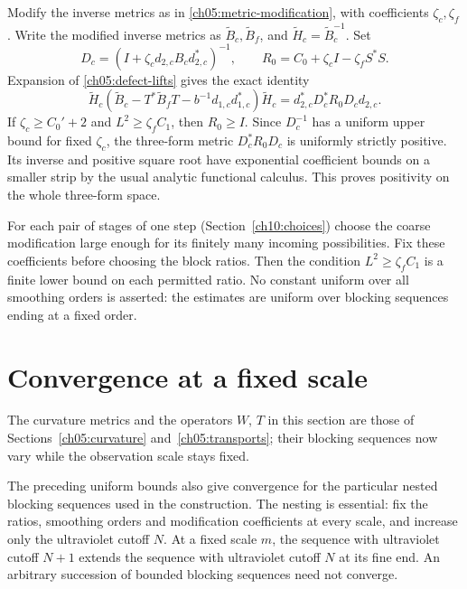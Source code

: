 Modify the inverse metrics as in
\eqref{ch05:metric-modification}, with coefficients
$\zeta_c,\zeta_f$. Write the modified inverse metrics as
$\widetilde B_c,\widetilde B_f$, and
$\widetilde H_c=\widetilde B_c^{-1}$.
Set
\[
 D_c=(I+\zeta_c d_{2,c}B_cd_{2,c}^*)^{-1},\qquad
 R_0=C_0+\zeta_c I-\zeta_f S^*S.
\]
Expansion of \eqref{ch05:defect-lifts} gives the exact identity
\begin{equation}
 \widetilde H_c
   (\widetilde B_c-T^*\widetilde B_fT
                         -b^{-1}d_{1,c}d_{1,c}^*)
       \widetilde H_c
       =d_{2,c}^*D_c^*R_0D_cd_{2,c}.
 \label{ch05:positive-defect}
\end{equation}
If $\zeta_c\ge C_0'+2$ and $L^2\ge\zeta_f C_1$, then
$R_0\ge I$. Since $D_c^{-1}$ has a uniform upper bound for
fixed $\zeta_c$, the three-form metric $D_c^*R_0D_c$ is
uniformly strictly positive. Its inverse and positive square
root have exponential coefficient bounds on a smaller strip
by the usual analytic functional calculus.
This proves positivity on the whole three-form space.

For each pair of stages of one step (Section~\ref{ch10:choices}) choose the coarse modification
large enough for its finitely many incoming possibilities.
Fix these coefficients before choosing the block ratios.
Then the condition $L^2\ge\zeta_f C_1$ is a finite lower
bound on each permitted ratio. No constant uniform over all
smoothing orders is asserted: the estimates are uniform over
blocking sequences ending at a fixed order.

\section{Convergence at a fixed scale}
\label{ch05:horizon-convergence}

The curvature metrics and the operators $W$, $T$ in this section are those of Sections~\ref{ch05:curvature} and~\ref{ch05:transports}; their blocking sequences now vary while the observation scale stays fixed.

The preceding uniform bounds also give convergence for the particular
nested blocking sequences used in the construction. The nesting is essential:
fix the ratios, smoothing orders and modification coefficients at every
scale, and increase only the ultraviolet cutoff $N$. At a fixed scale $m$, the
sequence with ultraviolet cutoff $N+1$ extends the sequence with ultraviolet cutoff
$N$ at its fine end. An arbitrary succession of bounded blocking sequences need
not converge.

